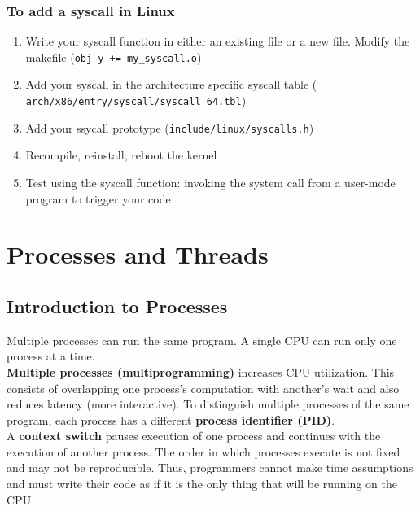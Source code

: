 \documentclass{article}
\begin{document}
    \subsubsection{To add a syscall in Linux}

    \begin{enumerate}
    \item Write your syscall function in either an existing file or a new file. Modify the makefile (\texttt{obj-y += my\_syscall.o})
    \item Add your syscall in the architecture specific syscall table (
    \texttt{arch/x86/entry/syscall/syscall\_64.tbl})
    \item Add your ssycall prototype (\texttt{include/linux/syscalls.h})
    \item Recompile, reinstall, reboot the kernel
    \item Test using the syscall function: invoking the system call from a user-mode program to trigger your code
    \end{enumerate}

\newpage
\section{Processes and Threads}

\subsection{Introduction to Processes}

    Multiple processes can run the same program. A single CPU can run only one process at a time. \\

    \noindent \textbf{Multiple processes (multiprogramming)} increases CPU utilization. This consists of overlapping one process's computation with another's wait and also reduces latency (more interactive). To distinguish multiple processes of the same program, each process has a different \textbf{process identifier (PID)}. \\

    \noindent A \textbf{context switch} pauses execution of one process and continues with the execution of another process. The order in which processes execute is not fixed and may not be reproducible. Thus, programmers cannot make time assumptions and must write their code as if it is the only thing that will be running on the CPU. \\
\end{document}
